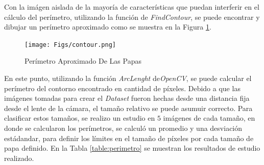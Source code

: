 Con la imágen aislada de la mayoría de características que puedan interferir en el cálculo del perímetro, utilizando la función de \textit{FindContour}, se puede encontrar y dibujar un perímetro aproximado como se muestra en la Figura \ref{fig:contour}.

\begin{figure}[ht]
	\centering
	\texttt{[image: Figs/contour.png]}
	\caption{Perímetro Aproximado De Las Papas}
	\label{fig:contour}
\end{figure}

En este punto, utilizando la función \textit{ArcLenght} de\textit{OpenCV}, se puede calcular el perímetro del contorno encontrado en cantidad de píxeles. Debido a que las imágenes tomadas para crear el \textit{Dataset} fueron hechas desde una distancia fija desde el lente de la cámara, el tamaño relativo se puede asumuir correcto. Para clasificar estos tamaños, se realizo un estudio en $5$ imágenes de cada tamaño, en donde se calcularon los perímetros, se calculó un promedio y una desviación estádandar, para definir los límites en el tamaño de píxeles por cada tamaño de papa definido. En la Tabla \ref{table:perimetro} se muestran los resultados de estudio realizado.

